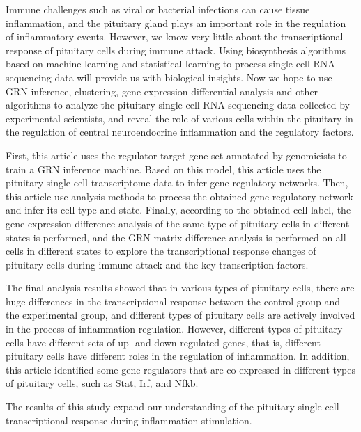 \begin{abstract*}
  Immune challenges such as viral or bacterial infections can cause tissue inflammation, and the pituitary gland plays an important role in the regulation of inflammatory events. However, we know very little about the transcriptional response of pituitary cells during immune attack. Using biosynthesis algorithms based on machine learning and statistical learning to process single-cell RNA sequencing data will provide us with biological insights. Now we hope to use GRN inference, clustering, gene expression differential analysis and other algorithms to analyze the pituitary single-cell RNA sequencing data collected by experimental scientists, and reveal the role of various cells within the pituitary in the regulation of central neuroendocrine inflammation and the regulatory factors.

  First, this article uses the regulator-target gene set annotated by genomicists to train a GRN inference machine. Based on this model, this article uses the pituitary single-cell transcriptome data to infer gene regulatory networks. Then, this article use analysis methods to process the obtained gene regulatory network and infer its cell type and state. Finally, according to the obtained cell label, the gene expression difference analysis of the same type of pituitary cells in different states is performed, and the GRN matrix difference analysis is performed on all cells in different states to explore the transcriptional response changes of pituitary cells during immune attack and the key transcription factors.

  The final analysis results showed that in various types of pituitary cells, there are huge differences in the transcriptional response between the control group and the experimental group, and different types of pituitary cells are actively involved in the process of inflammation regulation. However, different types of pituitary cells have different sets of up- and down-regulated genes, that is, different pituitary cells have different roles in the regulation of inflammation. In addition, this article identified some gene regulators that are co-expressed in different types of pituitary cells, such as Stat, Irf, and Nfkb.

  The results of this study expand our understanding of the pituitary single-cell transcriptional response during inflammation stimulation.
\end{abstract*}

